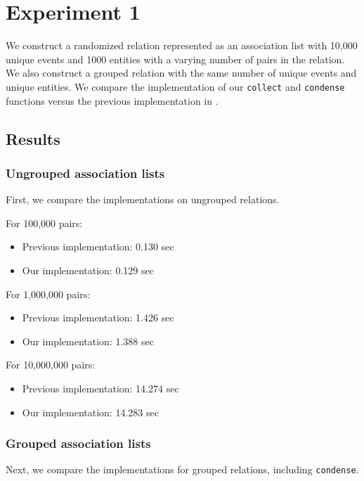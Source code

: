 \documentclass[../main.tex]{subfiles}
\begin{document}
\section{Experiment 1}

We construct a randomized relation represented as an association list with 10,000 unique events and 1000 entities with a varying
number of pairs in the relation.  We also construct a grouped relation with the same number of unique events and unique entities.
We compare the implementation of our \texttt{collect} and \texttt{condense} functions versus the previous implementation in
\cite{agboola2015extensible}.

\subsection{Results}

\subsubsection{Ungrouped association lists}
First, we compare the implementations on ungrouped relations.

For 100,000 pairs:

\begin{itemize}
	\item Previous implementation: 0.130 sec
	\item Our implementation: 0.129 sec
\end{itemize}

For 1,000,000 pairs:

\begin{itemize}
	\item Previous implementation: 1.426 sec
	\item Our implementation: 1.388 sec
\end{itemize}

For 10,000,000 pairs:

\begin{itemize}
	\item Previous implementation: 14.274 sec
	\item Our implementation: 14.283 sec
\end{itemize}

\subsubsection{Grouped association lists}
Next, we compare the implementations for grouped relations, including \texttt{condense}.
\end{document}
